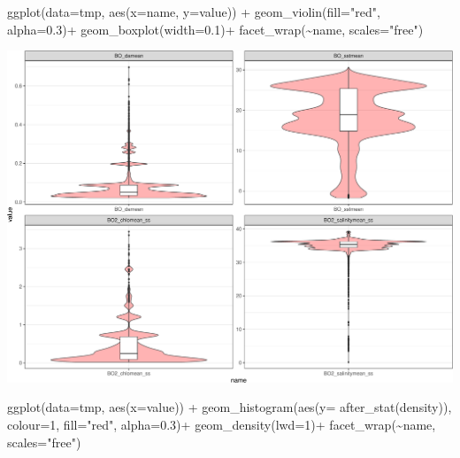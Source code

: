 \documentclass[
]{book}
\newenvironment{Shaded}{\begin{snugshade}}{\end{snugshade}}
\newcommand{\AttributeTok}[1]{\textcolor[rgb]{0.77,0.63,0.00}{#1}}
\newcommand{\DecValTok}[1]{\textcolor[rgb]{0.00,0.00,0.81}{#1}}
\newcommand{\FloatTok}[1]{\textcolor[rgb]{0.00,0.00,0.81}{#1}}
\newcommand{\FunctionTok}[1]{\textcolor[rgb]{0.00,0.00,0.00}{#1}}
\newcommand{\NormalTok}[1]{#1}
\newcommand{\SpecialCharTok}[1]{\textcolor[rgb]{0.00,0.00,0.00}{#1}}
\newcommand{\StringTok}[1]{\textcolor[rgb]{0.31,0.60,0.02}{#1}}
\begin{document}
\begin{Shaded}
\begin{Highlighting}[]
\FunctionTok{ggplot}\NormalTok{(}\AttributeTok{data=}\NormalTok{tmp, }\FunctionTok{aes}\NormalTok{(}\AttributeTok{x=}\NormalTok{name, }\AttributeTok{y=}\NormalTok{value)) }\SpecialCharTok{+} 
  \FunctionTok{geom\_violin}\NormalTok{(}\AttributeTok{fill=}\StringTok{"red"}\NormalTok{, }\AttributeTok{alpha=}\FloatTok{0.3}\NormalTok{)}\SpecialCharTok{+}
  \FunctionTok{geom\_boxplot}\NormalTok{(}\AttributeTok{width=}\FloatTok{0.1}\NormalTok{)}\SpecialCharTok{+}
  \FunctionTok{facet\_wrap}\NormalTok{(}\SpecialCharTok{\textasciitilde{}}\NormalTok{name, }\AttributeTok{scales=}\StringTok{"free"}\NormalTok{)}
\end{Highlighting}
\end{Shaded}

\includegraphics{_main_files/figure-latex/unnamed-chunk-48-2.pdf}

\begin{Shaded}
\begin{Highlighting}[]
\FunctionTok{ggplot}\NormalTok{(}\AttributeTok{data=}\NormalTok{tmp, }\FunctionTok{aes}\NormalTok{(}\AttributeTok{x=}\NormalTok{value)) }\SpecialCharTok{+} 
  \FunctionTok{geom\_histogram}\NormalTok{(}\FunctionTok{aes}\NormalTok{(}\AttributeTok{y=} \FunctionTok{after\_stat}\NormalTok{(density)), }\AttributeTok{colour=}\DecValTok{1}\NormalTok{, }\AttributeTok{fill=}\StringTok{"red"}\NormalTok{, }\AttributeTok{alpha=}\FloatTok{0.3}\NormalTok{)}\SpecialCharTok{+}
  \FunctionTok{geom\_density}\NormalTok{(}\AttributeTok{lwd=}\DecValTok{1}\NormalTok{)}\SpecialCharTok{+}
  \FunctionTok{facet\_wrap}\NormalTok{(}\SpecialCharTok{\textasciitilde{}}\NormalTok{name, }\AttributeTok{scales=}\StringTok{"free"}\NormalTok{)}
\end{Highlighting}
\end{Shaded}
\end{document}
